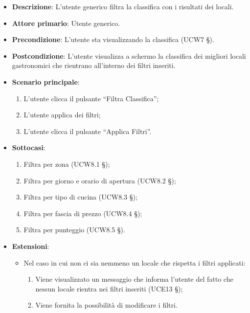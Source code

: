 \begin{itemize}
	\item \textbf{Descrizione}: L'utente generico filtra la classifica con i risultati dei locali.
    \item \textbf{Attore primario}: Utente generico.
    \item \textbf{Precondizione}: L’utente sta visualizzando la classifica (UCW7 §).
    \item \textbf{Postcondizione}: L’utente visualizza a schermo la classifica dei migliori locali gastronomici che rientrano all’interno dei filtri inseriti.
    \item \textbf{Scenario principale}: 
    \begin{enumerate}
        \item L’utente clicca il pulsante “Filtra Classifica”;
        \item L’utente applica dei filtri;
        \item L’utente clicca il pulsante “Applica Filtri”.
    \end{enumerate}

    \item \textbf{Sottocasi}:
    \begin{enumerate}
        \item Filtra per zona (UCW8.1 §);
        \item Filtra per giorno e orario di apertura (UCW8.2 §);
        \item Filtra per tipo di cucina (UCW8.3 §);
        \item Filtra per fascia di prezzo (UCW8.4 §);
        \item Filtra per punteggio (UCW8.5 §).
    \end{enumerate}

    \item \textbf{Estensioni}:
    \begin{itemize}
        \item Nel caso in cui non ci sia nemmeno un locale che rispetta i filtri applicati:
        \begin{enumerate}
            \item Viene visualizzato un messaggio che informa l’utente del fatto che nessun locale rientra nei filtri inseriti (UCE13 §);
            \item Viene fornita la possibilità di modificare i filtri.
        \end{enumerate}
    \end{itemize}
\end{itemize}

